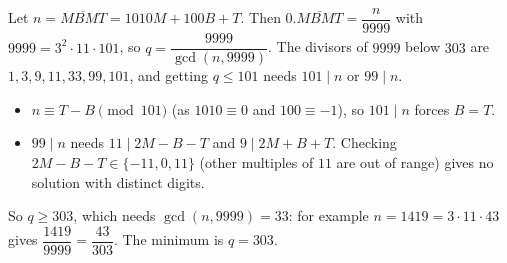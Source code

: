Let $n=\overline{MBMT}=1010M+100B+T$. Then $0.\overline{MBMT}=\dfrac n{9999}$ with $9999=3^2\cdot11\cdot101$, so $q=\dfrac{9999}{\gcd(n,9999)}$. The divisors of $9999$ below $303$ are $1,3,9,11,33,99,101$, and getting $q\le101$ needs $101\mid n$ or $99\mid n$.
\begin{itemize}
\item $n\equiv T-B\pmod{101}$ (as $1010\equiv0$ and $100\equiv-1$), so $101\mid n$ forces $B=T$.
\item $99\mid n$ needs $11\mid 2M-B-T$ and $9\mid 2M+B+T$. Checking $2M-B-T\in\{-11,0,11\}$ (other multiples of $11$ are out of range) gives no solution with distinct digits.
\end{itemize}
So $q\ge303$, which needs $\gcd(n,9999)=33$: for example $n=1419=3\cdot11\cdot43$ gives $\dfrac{1419}{9999}=\dfrac{43}{303}$. The minimum is $q=\boxed{303}$.
